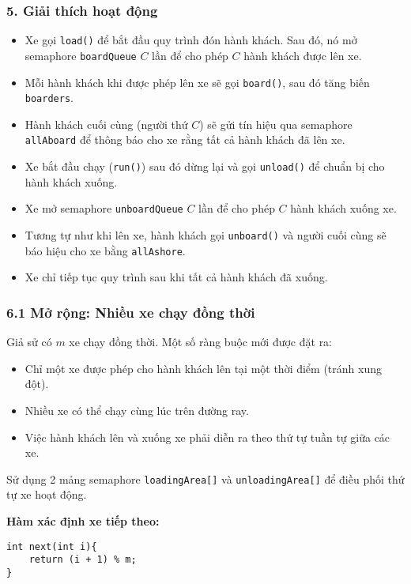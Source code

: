 \subsubsection*{5. Giải thích hoạt động}

\begin{itemize}
    \item Xe gọi \texttt{load()} để bắt đầu quy trình đón hành khách. Sau đó, nó mở semaphore \texttt{boardQueue} $C$ lần để cho phép $C$ hành khách được lên xe.
    \item Mỗi hành khách khi được phép lên xe sẽ gọi \texttt{board()}, sau đó tăng biến \texttt{boarders}.
    \item Hành khách cuối cùng (người thứ $C$) sẽ gửi tín hiệu qua semaphore \texttt{allAboard} để thông báo cho xe rằng tất cả hành khách đã lên xe.
    \item Xe bắt đầu chạy (\texttt{run()}) sau đó dừng lại và gọi \texttt{unload()} để chuẩn bị cho hành khách xuống.
    \item Xe mở semaphore \texttt{unboardQueue} $C$ lần để cho phép $C$ hành khách xuống xe.
    \item Tương tự như khi lên xe, hành khách gọi \texttt{unboard()} và người cuối cùng sẽ báo hiệu cho xe bằng \texttt{allAshore}.
    \item Xe chỉ tiếp tục quy trình sau khi tất cả hành khách đã xuống.
\end{itemize}

\subsubsection*{6.1 Mở rộng: Nhiều xe chạy đồng thời}

Giả sử có $m$ xe chạy đồng thời. Một số ràng buộc mới được đặt ra:

\begin{itemize}
    \item Chỉ một xe được phép cho hành khách lên tại một thời điểm (tránh xung đột).
    \item Nhiều xe có thể chạy cùng lúc trên đường ray.
    \item Việc hành khách lên và xuống xe phải diễn ra theo thứ tự tuần tự giữa các xe.
\end{itemize}

Sử dụng 2 mảng semaphore \texttt{loadingArea[]} và \texttt{unloadingArea[]} để điều phối thứ tự xe hoạt động.

\textbf{Hàm xác định xe tiếp theo:}
\begin{lstlisting}
int next(int i){
    return (i + 1) % m;
}
    
\end{lstlisting}

